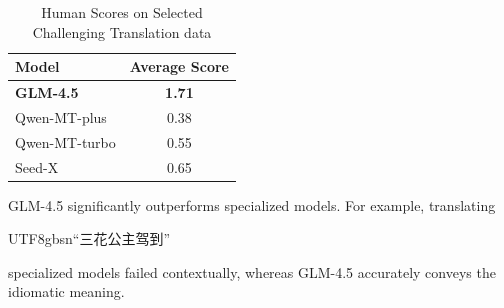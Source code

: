 \begin{table}[ht]
    \centering
    
    \caption{ Human Scores on Selected Challenging Translation data}
    \begin{tabular}{l c}
    \toprule
    Model & Average Score \\
    \midrule
    \textbf{GLM-4.5}     & \textbf{1.71} \\
    Qwen-MT-plus         & 0.38 \\
    Qwen-MT-turbo        & 0.55 \\
    Seed-X               & 0.65 \\
    \bottomrule
    \end{tabular}
    \label{tab:translation}
\end{table}


GLM-4.5 significantly outperforms specialized models. For example, translating \begin{CJK*}{UTF8}{gbsn}``三花公主驾到''\end{CJK*} specialized models failed contextually, whereas GLM-4.5 accurately conveys the idiomatic meaning.

